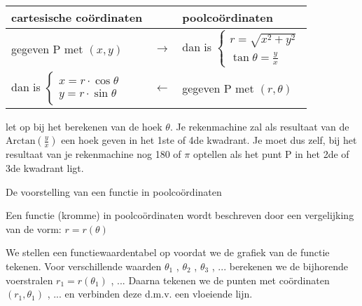 \begin{minipage}{.48\linewidth}
	\begin{tabular}{lcl}
		cartesische co\"ordinaten &  & poolco\"ordinaten  \\
		\hline
		gegeven P met $\left(x,y\right)$ & $\rightarrow$ & dan is $\begin{cases}
		r=\sqrt{x^{2}+y^{2}}\\
		\tan\theta=\frac{y}{x}
		\end{cases}$  \\
		dan is $\begin{cases}
		x=r\cdot\cos\theta\\
		y=r\cdot\sin\theta
		\end{cases}$ & $\leftarrow$ & gegeven P met $\left(r,\theta\right)$ \\
	\end{tabular}
\end{minipage}
\hspace{1cm}
\begin{minipage}{.48\linewidth}
	\centering
	
\end{minipage}

\vspace{1cm}

\begin{opmerking}
let op bij het berekenen van de hoek $\theta$. Je rekenmachine
zal als resultaat van de $\textrm{Arctan}\left(\frac{y}{x}\right)$
een hoek geven in het 1ste of 4de kwadrant. Je moet dus zelf, bij
het resultaat van je rekenmachine nog 180\textdegree{} of $\pi$ optellen
als het punt P in het 2de of 3de kwadrant ligt.
\end{opmerking}

De voorstelling van een functie in poolco\"ordinaten

Een functie (kromme) in poolco\"ordinaten wordt beschreven
door een vergelijking van de vorm: $r=r(\theta)$


We stellen een functiewaardentabel op voordat we de grafiek
van de functie tekenen. Voor verschillende waarden $\theta_{1}$ ,
$\theta_{2}$ , $\theta_{3}$ , ... berekenen we de bijhorende voerstralen
$r_{1}=r\left(\theta_{1}\right)$ , ... Daarna tekenen we de punten
met co\"ordinaten $\left(r_{1},\theta_{1}\right)$ , ... en verbinden
deze d.m.v. een vloeiende lijn.

